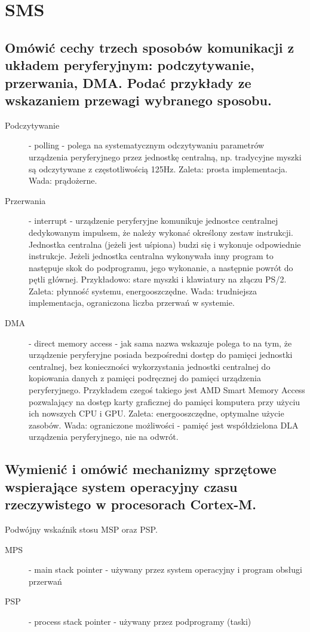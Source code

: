 \section{SMS}
\subsection{Omówić cechy trzech sposobów komunikacji z układem peryferyjnym: podczytywanie, przerwania, DMA. Podać przykłady ze wskazaniem przewagi wybranego sposobu.}
\begin{description}
    \item[Podczytywanie] - polling - polega na systematycznym odczytywaniu parametrów urządzenia peryferyjnego przez jednostkę centralną, np. tradycyjne myszki są odczytywane z częstotliwością 125Hz. Zaleta: prosta implementacja. Wada: prądożerne.
    \item[Przerwania] - interrupt - urządzenie peryferyjne komunikuje jednostce centralnej dedykowanym impulsem, że należy wykonać określony zestaw instrukcji. Jednostka centralna (jeżeli jest uśpiona) budzi się i wykonuje odpowiednie instrukcje. Jeżeli jednostka centralna wykonywała inny program to następuje skok do podprogramu, jego wykonanie, a następnie powrót do pętli głównej. Przykładowo: stare myszki i klawiatury na złączu PS/2. Zaleta: płynność systemu, energooszczędne. Wada: trudniejsza implementacja, ograniczona liczba przerwań w systemie.
    \item[DMA] - direct memory access - jak sama nazwa wskazuje polega to na tym, że urządzenie peryferyjne posiada bezpośredni dostęp do pamięci jednostki centralnej, bez konieczności wykorzystania jednostki centralnej do kopiowania danych z pamięci podręcznej do pamięci urządzenia peryferyjnego. Przykładem czegoś takiego jest AMD Smart Memory Access pozwalający na dostęp karty graficznej do pamięci komputera przy użyciu ich nowszych CPU i GPU. Zaleta: energooszczędne, optymalne użycie zasobów. Wada: ograniczone możliwości - pamięć jest współdzielona DLA urządzenia peryferyjnego, nie na odwrót.
\end{description}

\subsection{Wymienić i omówić mechanizmy sprzętowe wspierające system operacyjny czasu rzeczywistego w procesorach Cortex-M.}
Podwójny wskaźnik stosu MSP oraz PSP.
\begin{description}
    \item[MPS] - main stack pointer - używany przez system operacyjny i program obsługi przerwań
    \item[PSP] - process stack pointer - używany przez podprogramy (taski)
\end{description}

